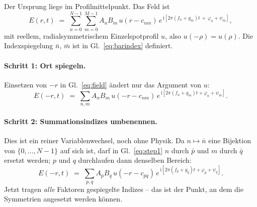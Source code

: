 \documentclass[11pt,a4paper]{article}
\begin{document}
Der Ursprung liege im Profilmittelpunkt. Das Feld ist
\begin{equation}
  E(r,t) \;=\; \sum_{n=0}^{N-1}\sum_{m=0}^{M-1} A_n B_m\, u(r-c_{nm})\,
  e^{\,\mathrm{i}\left[2\pi (f_n+g_m)t \,+\, \varphi_n+\psi_m\right]},
  \label{eq:field}
\end{equation}
mit reellem, radialsymmetrischem Einzelspotprofil $u$, also $u(-\rho)=u(\rho)$.
Die Indexspiegelung $\bar n$, $\bar m$ ist in Gl.~\eqref{eq:barindex} definiert.

\paragraph{Schritt 1: Ort spiegeln.}
Einsetzen von $-r$ in Gl.~\eqref{eq:field} ändert nur das Argument von $u$:
\begin{equation}
  E(-r,t) \;=\; \sum_{n,m} A_n B_m\, u(-r-c_{nm})\,
  e^{\,\mathrm{i}\left[2\pi (f_n+g_m)t + \varphi_n+\psi_m\right]}.
  \label{eq:step1}
\end{equation}

\paragraph{Schritt 2: Summationsindizes umbenennen.}
Dies ist ein reiner Variablenwechsel, noch ohne Physik. Da
$n\mapsto\bar n$ eine Bijektion von $\{0,\dots,N-1\}$ auf sich ist, darf in
Gl.~\eqref{eq:step1} $n$ durch $\bar p$ und $m$ durch $\bar q$ ersetzt werden;
$p$ und $q$ durchlaufen dann denselben Bereich:
\begin{equation}
  E(-r,t) \;=\; \sum_{p,q} A_{\bar p} B_{\bar q}\, u(-r-c_{\bar p\bar q})\,
  e^{\,\mathrm{i}\left[2\pi (f_{\bar p}+g_{\bar q})t
  + \varphi_{\bar p}+\psi_{\bar q}\right]}.
  \label{eq:step2}
\end{equation}
Jetzt tragen \emph{alle} Faktoren gespiegelte Indizes -- das ist der Punkt, an
dem die Symmetrien angesetzt werden können.
\end{document}
